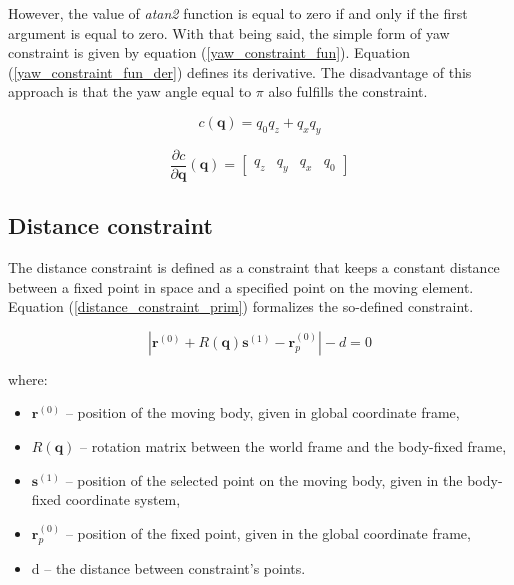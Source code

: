However, the value of \textit{atan2} function is equal to zero if and only if the first argument is equal to zero. With that being said, the simple form of yaw constraint is given by equation (\ref{yaw_constraint_fun}). Equation (\ref{yaw_constraint_fun_der}) defines its derivative. The disadvantage of this approach is that the yaw angle equal to $\pi$ also fulfills the constraint.

\begin{equation}
	c \left( \bm{q} \right) = q_{0}q_{z}+q_{x}q_{y}
	\label{yaw_constraint_fun}
\end{equation}

\begin{equation}
	\frac{\partial c}{\partial \bm{q}}  \left( \bm{q} \right) =
	\begin{bmatrix}
	 q_{z} &  q_{y} &  q_{x} &  q_{0}
	\end{bmatrix}
	\label{yaw_constraint_fun_der}
\end{equation}

\subsection{Distance constraint}

The distance constraint is defined as a constraint that keeps a constant distance between a fixed point in space and a specified point on the moving element. Equation (\ref{distance_constraint_prim}) formalizes the so-defined constraint.

\begin{equation}
	\left| \bm{r}^{(0)} + R(\bm{q})\bm{s}^{(1)} - \bm{r}_p^{(0)} \right| - d = 0
	\label{distance_constraint_prim}
\end{equation}

where:
\begin{itemize}[noitemsep]
	\item $\bm{r}^{(0)}$ -- position of the moving body, given in global coordinate frame,
	\item $R(\bm{q})$ -- rotation matrix between the world frame and the body-fixed frame,
	\item $\bm{s}^{(1)}$ -- position of the selected point on the moving body, given in the body-fixed coordinate system,
	\item $\bm{r}_p^{(0)}$ -- position of the fixed point, given in the global coordinate frame,
	\item d -- the distance between constraint's points.
\end{itemize}

